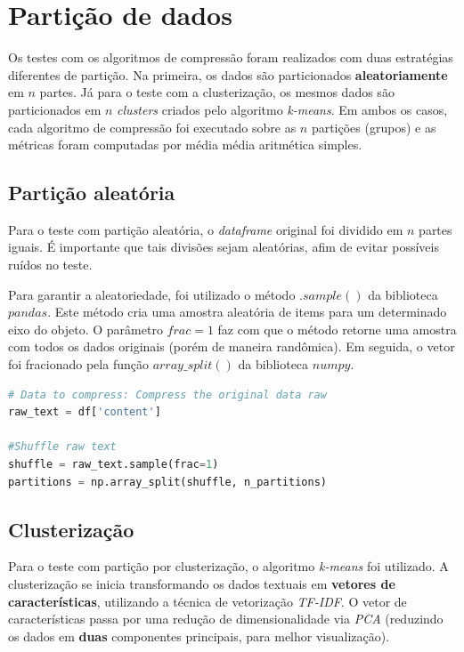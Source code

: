 \section{Partição de dados}
Os testes com os algoritmos de compressão foram realizados com duas estratégias diferentes de partição.
Na primeira, os dados são particionados \textbf{aleatoriamente} em $n$ partes.
Já para o teste com a clusterização, os mesmos dados são particionados em $n$ \emph{clusters} criados pelo algoritmo \emph{k-means}.
Em ambos os casos, cada algoritmo de compressão foi executado sobre as $n$ partições (grupos) e as métricas foram computadas por média média aritmética simples.

\subsection{Partição aleatória} \label{ssec:randomp}
Para o teste com partição aleatória, o \emph{dataframe} original foi dividido em $n$ partes iguais.
É importante que tais divisões sejam aleatórias, afim de evitar possíveis ruídos no teste.

Para garantir a aleatoriedade, foi utilizado o método $.sample()$ da biblioteca $pandas$. 
Este método cria uma amostra aleatória de items para um determinado eixo do objeto. 
O parâmetro $frac=1$ faz com que o método retorne uma amostra com todos os dados originais (porém de maneira randômica).
Em seguida, o vetor foi fracionado pela função $array\_split()$ da biblioteca $numpy$.

\begin{lstlisting}[language=Python, caption=Partição aleatória de dados]
# Data to compress: Compress the original data raw
raw_text = df['content']

#Shuffle raw text
shuffle = raw_text.sample(frac=1)
partitions = np.array_split(shuffle, n_partitions)
\end{lstlisting}

\subsection{Clusterização}
Para o teste com partição por clusterização, o algoritmo \emph{k-means} foi utilizado.
A clusterização se inicia transformando os dados textuais em \textbf{vetores de características}, utilizando a técnica de vetorização \emph{TF-IDF}. 
O vetor de características passa por uma redução de dimensionalidade via \emph{PCA} (reduzindo os dados em \textbf{duas} componentes principais, para melhor visualização).

